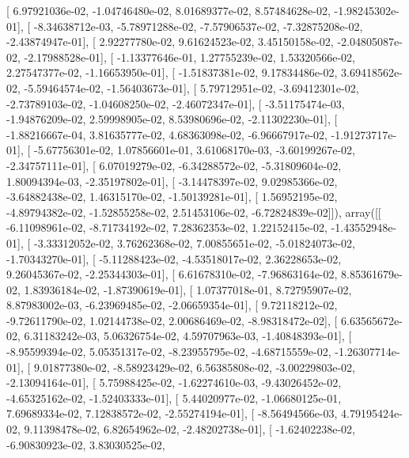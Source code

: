 \documentclass{article}
\begin{document}
       [  6.97921036e-02,  -1.04746480e-02,   8.01689377e-02,
          8.57484628e-02,  -1.98245302e-01],
       [ -8.34638712e-03,  -5.78971288e-02,  -7.57906537e-02,
         -7.32875208e-02,  -2.43874947e-01],
       [  2.92277780e-02,   9.61624523e-02,   3.45150158e-02,
         -2.04805087e-02,  -2.17988528e-01],
       [ -1.13377646e-01,   1.27755239e-02,   1.53320566e-02,
          2.27547377e-02,  -1.16653950e-01],
       [ -1.51837381e-02,   9.17834486e-02,   3.69418562e-02,
         -5.59464574e-02,  -1.56403673e-01],
       [  5.79712951e-02,  -3.69412301e-02,  -2.73789103e-02,
         -1.04608250e-02,  -2.46072347e-01],
       [ -3.51175474e-03,  -1.94876209e-02,   2.59998905e-02,
          8.53980696e-02,  -2.11302230e-01],
       [ -1.88216667e-04,   3.81635777e-02,   4.68363098e-02,
         -6.96667917e-02,  -1.91273717e-01],
       [ -5.67756301e-02,   1.07856601e-01,   3.61068170e-03,
         -3.60199267e-02,  -2.34757111e-01],
       [  6.07019279e-02,  -6.34288572e-02,  -5.31809604e-02,
          1.80094394e-03,  -2.35197802e-01],
       [ -3.14478397e-02,   9.02985366e-02,  -3.64882438e-02,
          1.46315170e-02,  -1.50139281e-01],
       [  1.56952195e-02,  -4.89794382e-02,  -1.52855258e-02,
          2.51453106e-02,  -6.72824839e-02]]), array([[ -6.11098961e-02,  -8.71734192e-02,   7.28362353e-02,
          1.22152415e-02,  -1.43552948e-01],
       [ -3.33312052e-02,   3.76262368e-02,   7.00855651e-02,
         -5.01824073e-02,  -1.70343270e-01],
       [ -5.11288423e-02,  -4.53518017e-02,   2.36228653e-02,
          9.26045367e-02,  -2.25344303e-01],
       [  6.61678310e-02,  -7.96863164e-02,   8.85361679e-02,
          1.83936184e-02,  -1.87390619e-01],
       [  1.07377018e-01,   8.72795907e-02,   8.87983002e-03,
         -6.23969485e-02,  -2.06659354e-01],
       [  9.72118212e-02,  -9.72611790e-02,   1.02144738e-02,
          2.00686469e-02,  -8.98318472e-02],
       [  6.63565672e-02,   6.31183242e-03,   5.06326754e-02,
          4.59707963e-03,  -1.40848393e-01],
       [ -8.95599394e-02,   5.05351317e-02,  -8.23955795e-02,
         -4.68715559e-02,  -1.26307714e-01],
       [  9.01877380e-02,  -8.58923429e-02,   6.56385808e-02,
         -3.00229803e-02,  -2.13094164e-01],
       [  5.75988425e-02,  -1.62274610e-03,  -9.43026452e-02,
         -4.65325162e-02,  -1.52403333e-01],
       [  5.44020977e-02,  -1.06680125e-01,   7.69689334e-02,
          7.12838572e-02,  -2.55274194e-01],
       [ -8.56494566e-03,   4.79195424e-02,   9.11398478e-02,
          6.82654962e-02,  -2.48202738e-01],
       [ -1.62402238e-02,  -6.90830923e-02,   3.83030525e-02,
\end{document}
